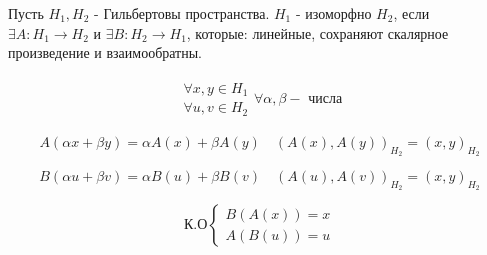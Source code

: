 \documentclass[12pt, a4paper]{report}
\begin{document}
\begin{definition}
    Пусть \( H_1, H_2 \) - Гильбертовы пространства. \( H_1  \) - изоморфно \( H_2 \), если \( \exists A : H_1 \to H_2 \) и \( \exists B : H_2 \to H_1 \), которые: линейные, сохраняют скалярное произведение и взаимообратны. 

    \[ \begin{aligned}
        \begin{aligned}
            \forall  x,y \in H_1 \\
            \forall  u,v \in H_2
        \end{aligned}
        \forall \alpha, \beta - \text{ числа} 
    \end{aligned} \]  

    \[ A(\alpha x +\beta y ) = \alpha A(x )+ \beta A(y) \quad (A(x), A(y ))_{H_2 } = (x,y )_{H_2} \] 
    
    \[ B(\alpha u+\beta v ) = \alpha B(u )+ \beta B(v)\quad ( A(u), A(v ))_{H_2 } = (x,y )_{H_2} \] 

    \[ \text{К.О}  \begin{cases}
        B(A(x )) =x \\ 
        A(B(u )) = u
    \end{cases}\] 
\end{definition}


\ifdefined\mainfile
\else
\end{document}
